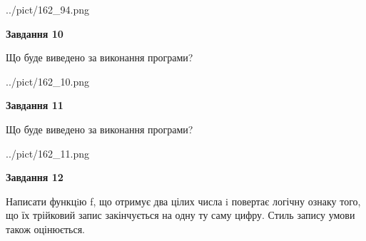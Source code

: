 \documentclass[12pt, ukrainian]{article}
\begin{document}
{\begin {large}
\begin{center}
	{../pict/162_94.png}
\end{center}
\newpage

{\begin {center}\textbf{Завдання 10}\end {center}}

Що буде виведено за виконання програми?\par
\begin{center}
	{../pict/162_10.png}
\end{center}
\newpage

{\begin {center}\textbf{Завдання 11}\end {center}}

Що буде виведено за виконання програми?\par
\begin{center}
	{../pict/162_11.png}
\end{center}
\newpage

{\begin {center}\textbf{Завдання 12}\end {center}}


Написати функцiю f, що отримує два цілих числа i повертає логічну ознаку того, що їх трійковий запис закінчується на одну ту саму цифру. Стиль запису умови також оцінюється.\par
\newpage

\end {large}}
\end{document}
